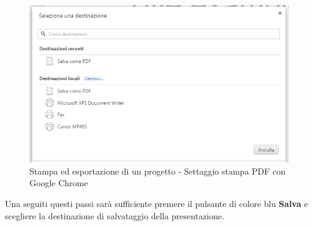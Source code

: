 \begin{figure}[H] 
	\centering 
	\includegraphics[scale=0.40] {img/salvacome.png}
	\caption{Stampa ed esportazione di un progetto - Settaggio stampa PDF con Google Chrome} 
\end{figure}

\noindent Una seguiti questi passi sarà sufficiente premere il pulsante di colore blu \textbf{Salva} e scegliere la destinazione di salvataggio della presentazione. 